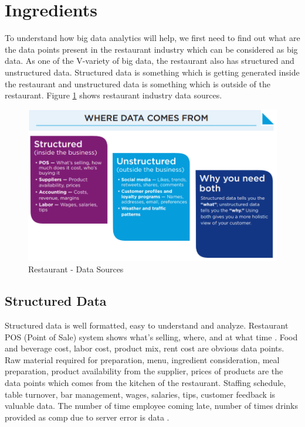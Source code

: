 \documentclass[sigconf]{acmart}
\begin{document}
\section{Ingredients}
To understand how big data analytics will help, we first need to find out what are the data points present in the restaurant industry which can be considered as big data. As one of the V-variety of big data, the restaurant also has structured and unstructured data. Structured data is something which is getting generated inside the restaurant and unstructured data is something which is outside of the restaurant. Figure \ref{F:datasource} shows restaurant industry data sources.
\begin{figure}
\includegraphics[width=1.0\columnwidth]{images/datasource}
\caption{Restaurant - Data Sources \cite{www-restaurant}}\label{F:datasource} 
\end{figure}

\subsection{Structured Data}
Structured data is well formatted, easy to understand and analyze. Restaurant POS (Point of Sale) system shows what's selling, where, and at what time \cite{www-qsr}. Food and beverage cost, labor cost, product mix, rent cost are obvious data points. Raw material required for preparation, menu, ingredient consideration, meal preparation, product availability from the supplier, prices of products are the data points which comes from the kitchen of the restaurant. Staffing schedule, table turnover, bar management, wages, salaries, tips, customer feedback is valuable data. The number of time employee coming late, number of times drinks provided as comp due to server error is data \cite{www-restaurant}.
\end{document}
